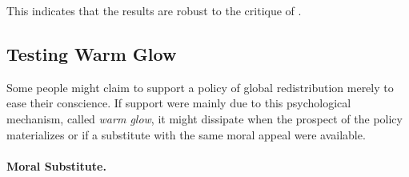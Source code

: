 \documentclass[12pt,english]{article}
\begin{document}
This indicates that the results are robust to the critique of \cite{de_la_cuesta_improving_2022}. 

\subsection{Testing Warm Glow}\label{subsec:warm_glow}

Some people might claim to support a policy of global redistribution merely to ease their conscience. If support were mainly due to this psychological mechanism, called \textit{warm glow}, it might
dissipate when the prospect of the policy materializes or if a substitute with the same moral appeal were available.

\paragraph{Moral Substitute.}
\end{document}

